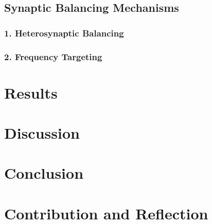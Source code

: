 \documentclass[11pt, twocolumn]{article}
\begin{document}
\subsection*{Synaptic Balancing Mechanisms}
\subsubsection*{1. Heterosynaptic Balancing}
\subsubsection*{2. Frequency Targeting}

\section*{Results}

\section*{Discussion}

\section*{Conclusion}

\printbibliography{}

\section*{Contribution and Reflection}
\end{document}
